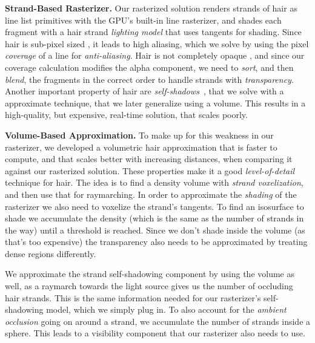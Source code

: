 \documentclass{egpubl}
\begin{document}

\noindent \textbf{Strand-Based Rasterizer. } Our rasterized solution renders strands of hair as line list primitives with the GPU's built-in line rasterizer, and shades each fragment with a hair strand \emph{lighting model} that uses tangents for shading. Since hair is sub-pixel sized \cite{leblanc1991rendering}, it leads to high aliasing, which we solve by using the pixel \emph{coverage} of a line for \emph{anti-aliasing}. Hair is not completely opaque \cite{sintorn2008real}, and since our coverage calculation modifies the alpha component, we need to \emph{sort}, and then \emph{blend}, the fragments in the correct order to handle strands with \emph{transparency}. Another important property of hair are \emph{self-shadows}~\cite{ward2007survey}, that we solve with a approximate technique, that we later generalize using a volume. This results in a high-quality, but expensive, real-time solution, that scales poorly.



\noindent \textbf{Volume-Based Approximation. } To make up for this weakness in our rasterizer, we developed a volumetric hair approximation that is faster to compute, and that scales better with increasing distances, when comparing it against our rasterized solution. These properties make it a good \emph{level-of-detail} technique for hair. The idea is to find a density volume with \emph{strand voxelization}, and then use that for raymarching. In order to approximate the \emph{shading} of the rasterizer we also need to voxelize the strand's tangents. To find an isosurface to shade we accumulate the density (which is the same as the number of strands in the way) until a threshold is reached. Since we don't shade inside the volume (as that's too expensive) the transparency also needs to be approximated by treating dense regions differently.

We approximate the strand self-shadowing component by using the volume as well, as a raymarch towards the light source gives us the number of occluding hair strands. This is the same information needed for our rasterizer's self-shadowing model, which we simply plug in. To also account for the \emph{ambient occlusion} going on around a strand, we accumulate the number of strands inside a sphere. This leads to a visibility component that our rasterizer also needs to use.
\end{document}
